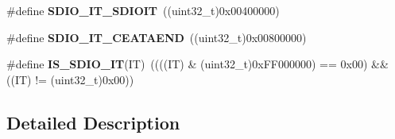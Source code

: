 \begin{DoxyCompactItemize}
\item 
\hypertarget{group___s_d_i_o___interrupt__sources_gaf5d7559460a9ff1fccc82d815de25cb4}{}\#define {\bfseries S\+D\+I\+O\+\_\+\+I\+T\+\_\+\+S\+D\+I\+O\+I\+T}~((uint32\+\_\+t)0x00400000)\label{group___s_d_i_o___interrupt__sources_gaf5d7559460a9ff1fccc82d815de25cb4}

\item 
\hypertarget{group___s_d_i_o___interrupt__sources_gae045cd5ba681d2df8b1031b8f659139a}{}\#define {\bfseries S\+D\+I\+O\+\_\+\+I\+T\+\_\+\+C\+E\+A\+T\+A\+E\+N\+D}~((uint32\+\_\+t)0x00800000)\label{group___s_d_i_o___interrupt__sources_gae045cd5ba681d2df8b1031b8f659139a}

\item 
\hypertarget{group___s_d_i_o___interrupt__sources_ga0e413e92ec50bab73042e8965acc3e6c}{}\#define {\bfseries I\+S\+\_\+\+S\+D\+I\+O\+\_\+\+I\+T}(I\+T)~((((I\+T) \& (uint32\+\_\+t)0x\+F\+F000000) == 0x00) \&\& ((\+I\+T) != (uint32\+\_\+t)0x00))\label{group___s_d_i_o___interrupt__sources_ga0e413e92ec50bab73042e8965acc3e6c}

\end{DoxyCompactItemize}


\subsection{Detailed Description}
